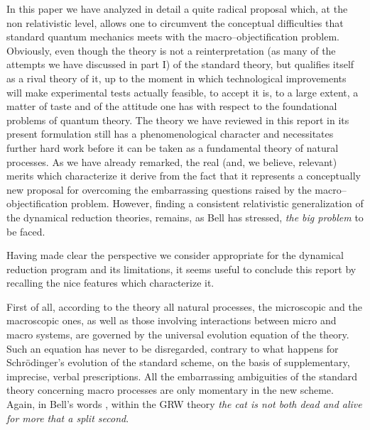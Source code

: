 \documentclass[12pt]{article}
\begin{document}
In this paper we have analyzed in detail a quite radical proposal
which, at the non relativistic level, allows one to circumvent the
conceptual difficulties that standard quantum mechanics meets with
the macro--objectification problem. Obviously, even though the
theory is not a reinterpretation (as many of the attempts we have
discussed in part I) of the standard theory, but qualifies itself
as a rival theory of it, up to the moment in which technological
improvements will make experimental tests actually feasible, to
accept it is, to a large extent, a matter of taste and of the
attitude one has with respect to the foundational problems of
quantum theory. The theory we have reviewed in this report in its
present formulation still has  a phenomenological character and
necessitates further hard work before it can be taken as a
fundamental theory of natural processes. As we have already
remarked,  the real (and, we believe, relevant) merits which
characterize it  derive from the fact that it represents a
conceptually new proposal for overcoming the embarrassing
questions raised by the macro--objectification problem. However,
finding a consistent relativistic generalization of the dynamical
reduction theories, remains, as Bell has stressed, {\it the big
problem} to be faced.

Having made clear the perspective we consider appropriate for  the
dynamical reduction program and its limitations,  it seems useful to
conclude this report by  recalling the nice features which
characterize it.

First of all, according to the theory all natural processes,  the
microscopic and the macroscopic ones, as well as those involving
interactions between micro and macro systems, are governed by the
universal evolution equation of the theory. Such an equation has
never to be disregarded, contrary to what happens for
Schr\"odinger's evolution  of the standard scheme, on the basis of
supplementary, imprecise, verbal prescriptions. All the
embarrassing ambiguities of the standard theory concerning macro
processes are only momentary in the new scheme. Again, in Bell's
words \cite{bells},  within the GRW theory {\it the cat is not
both dead and alive for more that a split second}.
\end{document}
